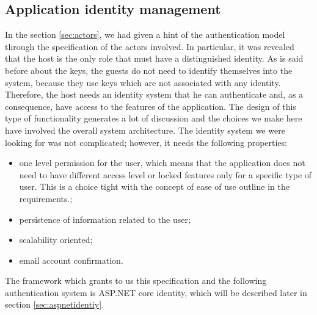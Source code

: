 \subsection{Application identity management}
In the section \ref{sec:actors}, we had given a hint of the authentication model through the specification of the actors involved. In particular, it was revealed that the host is the only role that must have a distinguished identity. As is said before about the keys, the guests do not need to identify themselves into the system, because they use keys which are not associated with any identity. 
\\ Therefore, the host needs an identity system that he can authenticate and, as a consequence, have access to the features of the application. The design of this type of functionality generates a lot of discussion and the choices we make here have involved the overall system architecture. The identity system we were looking for was not complicated; however, it needs the following properties:
\begin{itemize}
    \item one level permission for the user, which means that the application does not need to have different access level or locked features only for a specific type of user. This is a choice tight with the concept of ease of use outline in the requirements.;
    \item persistence of information related to the user;
    \item scalability oriented;
    \item email account confirmation.
\end{itemize}
The framework which grants to us this specification and the following authentication system is ASP.NET core identity, which will be described later in section \ref{sec:aspnetidentiy}.

